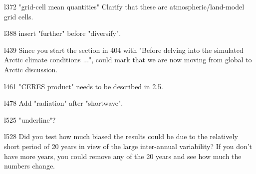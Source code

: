 \documentclass[12pt,oneside,a4paper]{article}%
\begin{document}
{\color{blue}{We have reworded and moved this last sentence, indicating that the total water SMB is different than the SMB internally computed by CLM, as a topic sentence to its own paragraph immediately following. We've added clarification on the role of the internally generated CLM SMB, that we don't use this definition in this study.}} \newline

l372 "grid-cell mean quantities" Clarify that these are atmospheric/land-model grid cells. \newline

{\color{blue}{Apologies for not understanding the suggestion here. What is it that needs clarification? A topic sentence in a paragraph in the methods section begins with ``CLM runs on the same grid as the atmosphere..." Is that what you are asking about?}} \newline

l388 insert "further" before "diversify". \newline

{\color{blue}{Done.}} \newline

l439 Since you start the section in 404 with "Before delving into the simulated Arctic climate conditions ...", could mark that we are now moving from global to Arctic discussion. \newline

{\color{blue}{Good suggestion. Done}} \newline

l461 "CERES product" needs to be described in 2.5. \newline

{\color{blue}{Done.}} \newline

l478 Add "radiation" after "shortwave". \newline

{\color{blue}{Done.}} \newline

l525 "underline"? \newline

{\color{blue}{Yes. Fixed.}} \newline

l528 Did you test how much biased the results could be due to the relatively short period of 20 years in view of the large inter-annual variability? If you don't have more years, you could remove any of the 20 years and see how much the numbers change. \newline
\end{document}

